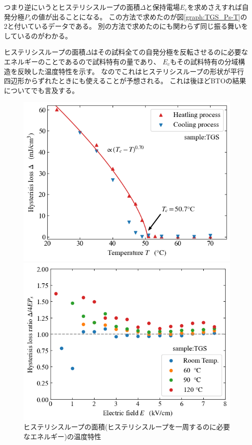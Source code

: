 \documentclass[11pt,dvipdfmx,a4paper]{jsarticle}
\begin{document}
つまり逆にいうとヒステリシスループの面積\(\Delta\)と保持電場\(E_c\)を求めさえすれば自発分極\(P_s\)の値が出ることになる。
この方法で求めたのが図\ref{graph:TGS_Ps-T}の2と付いているデータである。
別の方法で求めたのにも関わらず同じ振る舞いをしているのがわかる。

ヒステリシスループの面積\(\Delta\)はその試料全ての自発分極を反転させるのに必要なエネルギーのことであるので試料特有の量であり、
\(E_c\)もその試料特有の分域構造を反映した温度特性を示す。
なのでこれはヒステリシスループの形状が平行四辺形からずれたときにも使えることが予想される。
これは後ほどBTOの結果についてでも言及する。

\begin{figure}[H]
    \begin{minipage}[t]{0.48\columnwidth}
        \centering
        \includegraphics[width=\columnwidth]{TGS_Delta-T.png}
        \caption{\small{ヒステリシスループの面積(ヒステリシスループを一周するのに必要なエネルギー)の温度特性}}
        \label{graph:TGS_Delta-T}
    \end{minipage}
    \hfill
    \begin{minipage}[t]{0.48\columnwidth}
        \centering
        \includegraphics[width=\columnwidth]{TGS_Delta-E.png}

\end{minipage}
\end{figure}
\end{document}
